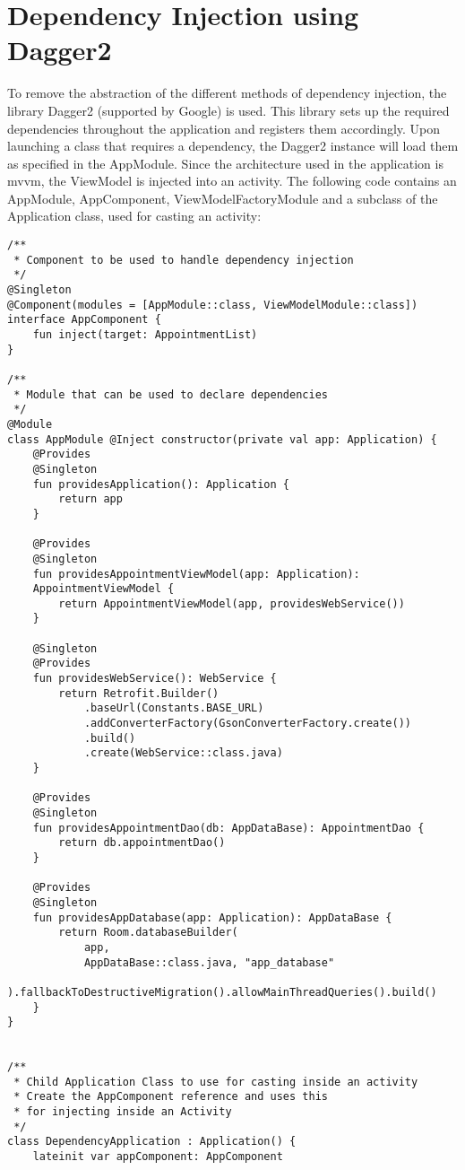 \section{Dependency Injection using Dagger2}
To remove the abstraction of the different methods of dependency injection, the library Dagger2 (supported by Google) is used. This library sets up the required dependencies throughout the application and registers them accordingly. Upon launching a class that requires a dependency, the Dagger2 instance will load them as specified in the AppModule. Since the architecture used in the application is \acrshort{mvvm}, the ViewModel is injected into an activity. The following code contains an AppModule, AppComponent, ViewModelFactoryModule and a subclass of the Application class, used for casting an activity:
\begin{verbatim}
/**
 * Component to be used to handle dependency injection
 */
@Singleton
@Component(modules = [AppModule::class, ViewModelModule::class])
interface AppComponent {
    fun inject(target: AppointmentList)
}

/**
 * Module that can be used to declare dependencies
 */
@Module
class AppModule @Inject constructor(private val app: Application) {
    @Provides
    @Singleton
    fun providesApplication(): Application {
        return app
    }

    @Provides
    @Singleton
    fun providesAppointmentViewModel(app: Application):
    AppointmentViewModel {
        return AppointmentViewModel(app, providesWebService())
    }

    @Singleton
    @Provides
    fun providesWebService(): WebService {
        return Retrofit.Builder()
            .baseUrl(Constants.BASE_URL)
            .addConverterFactory(GsonConverterFactory.create())
            .build()
            .create(WebService::class.java)
    }

    @Provides
    @Singleton
    fun providesAppointmentDao(db: AppDataBase): AppointmentDao {
        return db.appointmentDao()
    }

    @Provides
    @Singleton
    fun providesAppDatabase(app: Application): AppDataBase {
        return Room.databaseBuilder(
            app,
            AppDataBase::class.java, "app_database"
        ).fallbackToDestructiveMigration().allowMainThreadQueries().build()
    }
}


/**
 * Child Application Class to use for casting inside an activity
 * Create the AppComponent reference and uses this 
 * for injecting inside an Activity
 */
class DependencyApplication : Application() {
    lateinit var appComponent: AppComponent


\end{verbatim}
